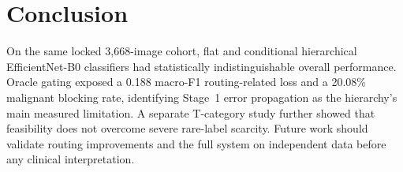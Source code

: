 \documentclass[a4paper,conference]{IEEEtran}
\begin{document}
\section{Conclusion}
On the same locked 3,668-image cohort, flat and conditional hierarchical
EfficientNet-B0 classifiers had statistically indistinguishable overall
performance. Oracle gating exposed a 0.188 macro-F1 routing-related loss and a
20.08\% malignant blocking rate, identifying Stage~1 error propagation as the
hierarchy's main measured limitation. A separate T-category study further
showed that feasibility does not overcome severe rare-label scarcity. Future
work should validate routing improvements and the full system on independent
data before any clinical interpretation.



\end{document}
